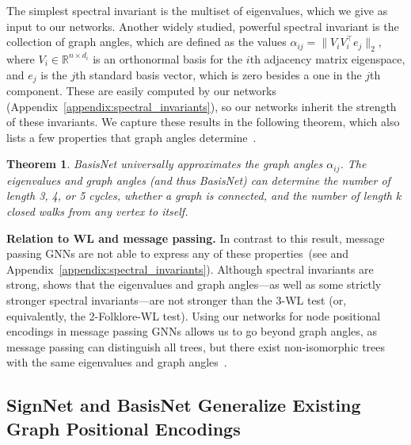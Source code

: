 \documentclass{article} \usepackage{iclr2023_conference,times}
\newcommand{\RR}{\mathbb R}
\newcommand\norm[1]{\lVert#1\rVert}
\newtheorem{theorem}{Theorem}
\begin{document}
The simplest spectral invariant is the multiset of eigenvalues, which we give as input to our networks. Another widely studied, powerful spectral invariant is the collection of graph angles, which are defined as the values $\alpha_{ij} = \norm{V_i V_i^\top e_j}_2$, where $V_i \in \RR^{n \times d_i}$ is an orthonormal basis for the $i$th adjacency matrix eigenspace, and $e_j$ is the $j$th standard basis vector, which is zero besides a one in the $j$th component. These are easily computed by our networks (Appendix~\ref{appendix:spectral_invariants}), so our networks inherit the strength of these invariants. We capture these results in the following theorem, which also lists a few properties that graph angles determine~\citep{cvetkovic1991some}. 

\begin{theorem}\label{prop:graph_angles}
    BasisNet universally approximates the graph angles $\alpha_{ij}$. The eigenvalues and graph angles (and thus BasisNet) can determine the number of length 3, 4, or 5 cycles, whether a graph is connected, and the number of length $k$ closed walks from any vertex to itself.
\end{theorem}

\textbf{Relation to WL and message passing.} In contrast to this result, message passing GNNs are not able to express any of these properties~(see \citep{arvind2020weisfeiler, garg2020} and Appendix~\ref{appendix:spectral_invariants}). Although spectral invariants are strong, \cite{furer2010power} shows that the eigenvalues and graph angles---as well as some strictly stronger spectral invariants---are not stronger than the 3-WL test (or, equivalently, the 2-Folklore-WL test). 
Using our networks for node positional encodings in  message passing GNNs allows us to go beyond graph angles, as message passing can distinguish all trees, but there exist non-isomorphic trees with the same eigenvalues and graph angles~\citep{furer2010power, cvetkovic1988constructing}.

\subsection{SignNet and BasisNet Generalize Existing Graph Positional Encodings}\label{sec:existing_pe}
\end{document}
